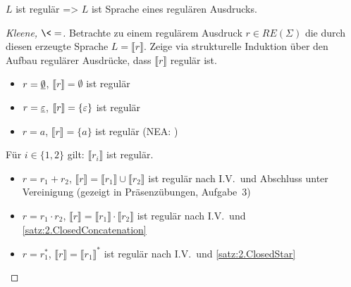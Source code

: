 {    
\begin{Satz}[Kleene]\label{sat:2.kleene}
$L$ ist regulär \<=> $L$ ist Sprache eines regulären Ausdrucks.
\end{Satz}


\begin{proof}[Kleene, $\<=$]
Betrachte zu einem regulärem Ausdruck $r\in RE(\Sigma)$ die durch diesen erzeugte Sprache $L=\llbracket r \rrbracket$. 
Zeige via strukturelle Induktion über den Aufbau regulärer Ausdrücke, dass $ \llbracket r \rrbracket$ regulär ist.
    	\begin{description}[font=\normalfont]
      \item[I.A.:] \hfill
        \vspace{-1.45\baselineskip}
        \begin{itemize}
        \item $r = \underline{\smash{\emptyset}}$, $\llbracket r \rrbracket = \emptyset$ ist regulär
        \item $r = \underline{\smash{\varepsilon}}$, $[\![ r ]\!] = \{ \varepsilon \}$ ist regulär
        \item $r = a$, $\llbracket r \rrbracket = \{ a \}$ ist regulär
          (\acs{NEA}: 
    			) 
        \end{itemize}
        \item[I.V.:] Für $i \in \{1, 2\}$ gilt: $\llbracket r_i \rrbracket$ ist regulär.
    		\item[I.S.:] \hfill
          \vspace{-1.45\baselineskip}
          \begin{itemize}
          \item $r = r_1 + r_2$, $\llbracket r \rrbracket = \llbracket r_1 \rrbracket \cup \llbracket r_2 \rrbracket$ ist regulär nach I.V.\ und Abschluss unter Vereinigung (gezeigt in Präsenzübungen, Aufgabe~3)
          \item $r = r_1 \cdot r_2$, $\llbracket r \rrbracket = \llbracket r_1 \rrbracket \cdot \llbracket r_2 \rrbracket$ ist regulär nach I.V.\ und \autoref{satz:2.ClosedConcatenation}
          \item $r = r_1^*$, $\llbracket r \rrbracket = \llbracket r_1 \rrbracket^*$ ist regulär nach I.V.\ und \autoref{satz:2.ClosedStar}
          \qedhere
          \end{itemize}
		\end{description}
\end{proof}


}

